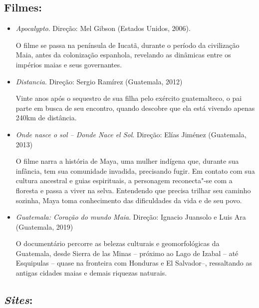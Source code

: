 \documentclass[12pt]{extarticle}
\begin{document}
\subsection{Filmes:}

\begin{itemize}
\item\textit{Apocalypto}. Direção: Mel Gibson (Estados Unidos, 2006).

O filme se passa na península de Iucatã, durante o período da civilização Maia, antes da colonização 
espanhola, revelando as dinâmicas entre os impérios maias e seus governantes.

\item\textit{Distancia}. Direção: Sergio Ramírez (Guatemala, 2012)

Vinte anos após o sequestro de sua filha pelo exército guatemalteco, o pai parte em busca de seu 
encontro, quando descobre que ela está vivendo apenas 240km de distância.

\item\textit{Onde nasce o sol -- Donde Nace el Sol}. Direção: Elías Jiménez (Guatemala, 2013)

O filme narra a história de Maya, uma mulher indígena que, durante sua infância, tem sua comunidade 
invadida, precisando fugir. Em contato com sua cultura ancestral e guias espirituais, a personagem 
reconecta"-se com a floresta e passa a viver na selva. Entendendo que precisa trilhar seu caminho 
sozinha, Maya toma conhecimento das dificuldades da vida e de seu povo.

\item\textit{Guatemala: Coração do mundo Maia}. Direção: Ignacio Juansolo e Luis Ara (Guatemala, 2019)

O documentário percorre as belezas culturais e geomorfológicas da Guatemala, desde Sierra de las Minas --
próximo ao Lago de Izabal -- até Esquipulas -- quase na fronteira com Honduras e El Salvador--, ressaltando 
as antigas cidades maias e demais riquezas naturais.
\end{itemize}

\subsection{\emph{Sites}:}
\end{document}
